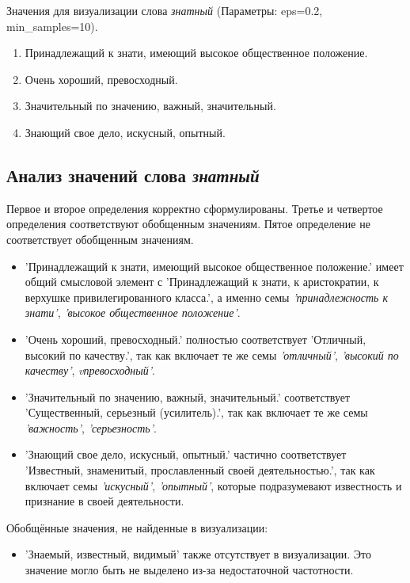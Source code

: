 Значения для визуализации слова \textit{знатный} (Параметры: eps=0.2, min\_samples=10).

\begin{enumerate}
    \item Принадлежащий к знати, имеющий высокое общественное положение.
    \item Очень хороший, превосходный.
    \item Значительный по значению, важный, значительный.
    \item Знающий свое дело, искусный, опытный.
\end{enumerate}

\subsection*{Анализ значений слова \textit{знатный}}

Первое и второе определения корректно сформулированы.
Третье и четвертое определения соответствуют обобщенным значениям.
Пятое определение не соответствует обобщенным значениям.

\begin{itemize}
    \item ’Принадлежащий к знати, имеющий высокое общественное положение.’ имеет общий смысловой элемент с
’Принадлежащий к знати, к аристократии, к верхушке привилегированного класса.’,
а именно семы \textit{’принадлежность к знати’}, \textit{’высокое общественное положение’}.

    \item ’Очень хороший, превосходный.’ полностью соответствует ’Отличный, высокий по качеству.’,
так как включает те же семы \textit{’отличный’}, \textit{’высокий по качеству’}, \textit{vпревосходный’}.

    \item ’Значительный по значению, важный, значительный.’ соответствует
’Существенный, серьезный (усилитель).’, так как включает те же семы \textit{’важность’}, \textit{’серьезность’}.

    \item ’Знающий свое дело, искусный, опытный.’ частично соответствует
’Известный, знаменитый, прославленный своей деятельностью.’,
так как включает семы \textit{’искусный’}, \textit{’опытный’}, которые подразумевают известность и признание в своей деятельности.
\end{itemize}

Обобщённые значения, не найденные в визуализации:
\begin{itemize}
    \item ’Знаемый, известный, видимый’ также отсутствует в визуализации.
Это значение могло быть не выделено из-за недостаточной частотности.
\end{itemize}

